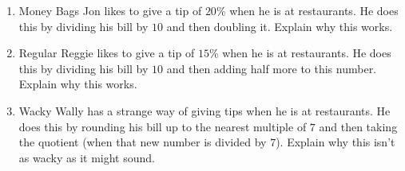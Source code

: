 \begin{problems}
\begin{enumerate}
\item Money Bags Jon likes to give a tip of $20$\% when he is at
  restaurants. He does this by dividing his bill by $10$ and then
  doubling it. Explain why this works.
\item Regular Reggie likes to give a tip of $15$\% when he is at
  restaurants. He does this by dividing his bill by $10$ and then
  adding half more to this number. Explain why this works.
\item Wacky Wally has a strange way of giving tips when he is at
  restaurants. He does this by rounding his bill up to the nearest
  multiple of $7$ and then taking the quotient (when that new number
  is divided by $7$). Explain why this isn't as wacky as it might
  sound.


\end{enumerate}
\end{problems}
